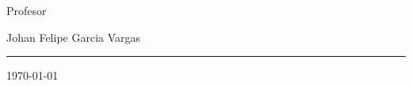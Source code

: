 \begin{titlepage}
\hspace{4cm}
{\AncizarSansLightItalic\normalsize\color{rojoUN} Profesor}

\vspace{0.2cm}

\hspace{4cm}
{\AncizarSansRegular\Large
Johan Felipe Garcia Vargas}

\vfill


\hspace{4cm}
{\color{verdeUN}\rule{3cm}{1.4pt}}

\vspace{0.35cm}

\hspace{4cm}
{\AncizarSansLightItalic\large
\today}

\end{titlepage}